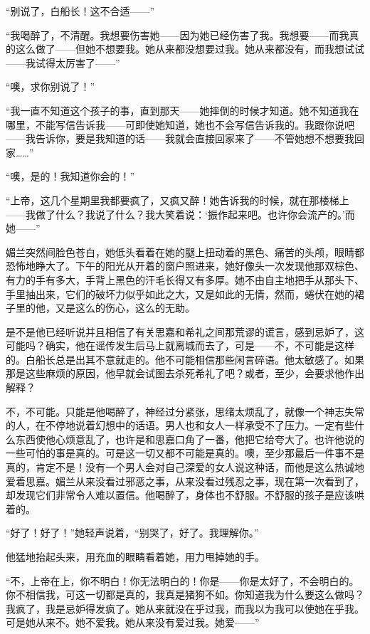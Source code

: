 \par “别说了，白船长！这不合适——”
\par “我喝醉了，不清醒。我想要伤害她——因为她已经伤害了我。我想要——而我真的这么做了——但她不想要我。她从来都没想要过我。她从来都没有，而我想试试——我试得太厉害了——”
\par “噢，求你别说了！”
\par “我一直不知道这个孩子的事，直到那天——她摔倒的时候才知道。她不知道我在哪里，不能写信告诉我——可即使她知道，她也不会写信告诉我的。我跟你说吧——我告诉你，要是我知道的话——我就会直接回家来了——不管她想不想要我回家……”
\par “噢，是的！我知道你会的！”
\par “上帝，这几个星期里我都要疯了，又疯又醉！她告诉我的时候，就在那楼梯上——我做了什么？我说了什么？我大笑着说：‘振作起来吧。也许你会流产的。’而她——”
\par 媚兰突然间脸色苍白，她低头看着在她的腿上扭动着的黑色、痛苦的头颅，眼睛都恐怖地睁大了。下午的阳光从开着的窗户照进来，她好像头一次发现他那双棕色、有力的手有多大，手背上黑色的汗毛长得又有多厚。她不由自主地把手从那头下、手里抽出来，它们的破坏力似乎如此之大，又是如此的无情，然而，蜷伏在她的裙子里的他，又是这么的伤心，这么的无助。
\par 是不是他已经听说并且相信了有关思嘉和希礼之间那荒谬的谎言，感到忌妒了，这可能吗？确实，他在谣传发生后马上就离城而去了，可是——不，不可能是这样的。白船长总是出其不意就走的。他不可能相信那些闲言碎语。他太敏感了。如果那是这些麻烦的原因，他早就会试图去杀死希礼了吧？或者，至少，会要求他作出解释？
\par 不，不可能。只能是他喝醉了，神经过分紧张，思绪太烦乱了，就像一个神志失常的人，在不停地说着幻想中的话语。男人也和女人一样承受不了压力。一定有些什么东西使他心烦意乱了，也许是和思嘉口角了一番，他把它给夸大了。也许他说的一些可怕的事是真的。可是这一切又都不可能是真的。噢，至少那最后一件事不是真的，肯定不是！没有一个男人会对自己深爱的女人说这种话，而他是这么热诚地爱着思嘉。媚兰从来没看过邪恶之事，从来没看过残忍之事，现在第一次看到了，却发现它们非常令人难以置信。他喝醉了，身体也不舒服。不舒服的孩子是应该哄着的。
\par “好了！好了！”她轻声说着，“别哭了，好了。我理解你。”
\par 他猛地抬起头来，用充血的眼睛看着她，用力甩掉她的手。
\par “不，上帝在上，你不明白！你无法明白的！你是——你是太好了，不会明白的。你不相信我，可这一切都是真的，我真是猪狗不如。你知道我为什么要这么做吗？我疯了，我是忌妒得发疯了。她从来就没在乎过我，而我以为我可以使她在乎我。可是她从来不。她不爱我。她从来没有爱过我。她爱——”
